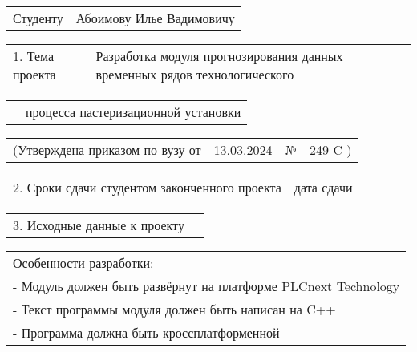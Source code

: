 \documentclass[12pt, А4, twoside]{article}
\begin{document}
\begin{FlushLeft} 
\fontsize{12}{15} 

    \begin{tabular}{p{1.9cm} p{14.95cm}}
        \textsf{Студенту} & 
        \textsf{Абоимову Илье Вадимовичу} \vspace{1pt} \hline 
    \end{tabular} 

    \begin{tabular}{p{2.8cm} p{14.05cm}}
        \textsf{1. Тема проекта} & 
        \textsf{Разработка модуля прогнозирования данных временных рядов технологического} \vspace{1pt} \hline  
    \end{tabular} 

    \begin{tabular}{p{2.8cm} p{14.05cm}} 
        & \textsf{процесса пастеризационной установки} \vspace{1pt} \hline 
    \end{tabular} 

    \begin{tabular}{p{5.9cm} p{4.8cm} p{0.3cm} p{5.0cm}} 
        \textsf{(Утверждена приказом по вузу от} &
        \centering \textsf{13.03.2024} \vspace{2pt} \hline &
        \centering \textsf{№} &
        \centering \textsf{249-C \hspace{0.5cm} )} \hline
    \end{tabular} 

    \begin{tabular}{p{9.4cm} p{7.45cm}} 
        \textsf{2. Сроки сдачи студентом законченного проекта} &
        \centering \textsf{дата сдачи} \vspace{1pt} \hline
    \end{tabular} 

    \begin{tabular}{p{5.7cm} p{11.15cm}} 
        \textsf{3. Исходные данные к проекту} &
        \vspace{1pt} \hline
    \end{tabular}   

    \begin{tabular}{p{17.25cm}}  
        \hspace{0.3cm} \textsf{Особенности разработки:} \vspace{1pt} \hline \\
        \hspace{0.6cm} \textsf{- Модуль должен быть развёрнут на платформе PLCnext Technology} \vspace{1pt} \hline \\
        \hspace{0.6cm} \textsf{- Текст программы модуля должен быть написан на C++}\vspace{1pt} \hline \\
        \hspace{0.6cm} \textsf{- Программа должна быть кроссплатформенной}\vspace{1pt} \hline 
    \end{tabular}   


\end{FlushLeft}
\end{document}
